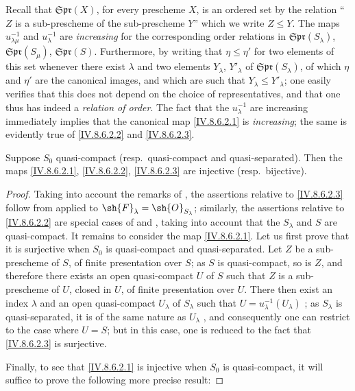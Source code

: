 
Recall  that $\mathfrak{Spr}(X)$, for every prescheme $X$, is an ordered set by the relation ``$Z$ is a sub-prescheme of the sub-prescheme $Y$'' which we write $Z\leqslant Y$.
The maps $u_{\lambda\mu}^{-1}$ and $u_\lambda^{-1}$ are \emph{increasing} for the corresponding order relations in $\mathfrak{Spr}(S_\lambda)$, $\mathfrak{Spr}(S_\mu)$, $\mathfrak{Spr}(S)$.
Furthermore, by writing that $\eta\leqslant\eta'$ for two elements of this set whenever there exist $\lambda$ and two elements $Y_\lambda$, $Y'_\lambda$ of $\mathfrak{Spr}(S_\lambda)$, of which $\eta$ and $\eta'$ are the canonical images, and which are such that $Y_\lambda\leqslant Y'_\lambda$; one easily verifies that this does not depend on the choice of representatives, and that one thus has indeed a \emph{relation of order}.
The fact that the $u_\lambda^{-1}$ are increasing immediately implies that the canonical map \eqref{IV.8.6.2.1} is \emph{increasing}; the same is evidently true of \eqref{IV.8.6.2.2} and \eqref{IV.8.6.2.3}.

\begin{proposition}[8.6.3]
\label{IV.8.6.3}
Suppose $S_0$ quasi-compact (resp.\ quasi-compact and quasi-separated).
Then the maps \eqref{IV.8.6.2.1}, \eqref{IV.8.6.2.2}, \eqref{IV.8.6.2.3} are injective (resp.\ bijective).
\end{proposition}

\begin{proof}
Taking into account the remarks of , the assertions relative to \eqref{IV.8.6.2.3} follow from  applied to $\sh{F}_\lambda=\sh{O}_{S_\lambda}$; similarly, the assertions relative to \eqref{IV.8.6.2.2} are special cases of  and , taking into account that the $S_\lambda$ and $S$ are quasi-compact.
It remains to consider the map \eqref{IV.8.6.2.1}.
Let us first prove that it is surjective when $S_0$ is quasi-compact and quasi-separated.
Let $Z$ be a sub-prescheme of $S$, of finite presentation over $S$; as $S$ is quasi-compact, so is $Z$, and therefore there exists an open quasi-compact $U$ of $S$ such that $Z$ is a sub-prescheme of $U$, closed in $U$, of finite presentation over $U$.
There then exist an index $\lambda$ and an open quasi-compact $U_\lambda$ of $S_\lambda$ such that $U=u_\lambda^{-1}(U_\lambda)$ ; as $S_\lambda$ is quasi-separated, it is of the same nature as $U_\lambda$ , and consequently one can restrict to the case where $U=S$; but in this case, one is reduced to the fact that \eqref{IV.8.6.2.3} is surjective.

Finally, to see that \eqref{IV.8.6.2.1} is injective when $S_0$ is quasi-compact, it will suffice to prove the following more precise result:
\end{proof}

